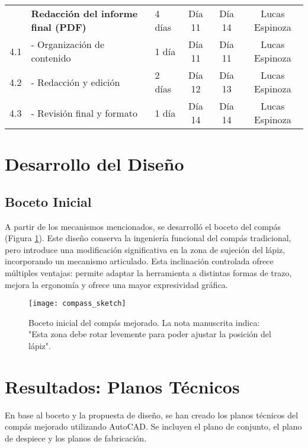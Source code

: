 \documentclass[11pt, a4paper]{article}
\begin{document}
\begin{table}[H]
{\begin{tabular}{@{}cllccc@{}}
        \addlinespace
        4   & \textbf{Redacción del informe final (PDF)} & 4 días & Día 11 & Día 14 & Lucas Espinoza \\
        \cmidrule(l){2-2}
        4.1 & \hspace{1em}- Organización de contenido & 1 día & Día 11 & Día 11 & Lucas Espinoza \\
        4.2 & \hspace{1em}- Redacción y edición & 2 días & Día 12 & Día 13 & Lucas Espinoza \\
        4.3 & \hspace{1em}- Revisión final y formato & 1 día & Día 14 & Día 14 & Lucas Espinoza \\
        \bottomrule
    \end{tabular}
    }
\end{table}

\section{Desarrollo del Diseño}
\subsection{Boceto Inicial}
A partir de los mecanismos mencionados, se desarrolló el boceto del compás (Figura \ref{fig:boceto}). Este diseño conserva la ingeniería funcional del compás tradicional, pero introduce una modificación significativa en la zona de sujeción del lápiz, incorporando un mecanismo articulado.
Esta inclinación controlada ofrece múltiples ventajas: permite adaptar la herramienta a distintas formas de trazo, mejora la ergonomía y ofrece una mayor expresividad gráfica.

\begin{figure}[H]
    \centering
    \texttt{[image: compass\_sketch]}
    \caption{Boceto inicial del compás mejorado. La nota manuscrita indica: "Esta zona debe rotar levemente para poder ajustar la posición del lápiz".}
    \label{fig:boceto}
\end{figure}
\newpage

\section{Resultados: Planos Técnicos}
En base al boceto y la propuesta de diseño, se han creado los planos técnicos del compás mejorado utilizando AutoCAD. Se incluyen el plano de conjunto, el plano de despiece y los planos de fabricación.
\end{document}
